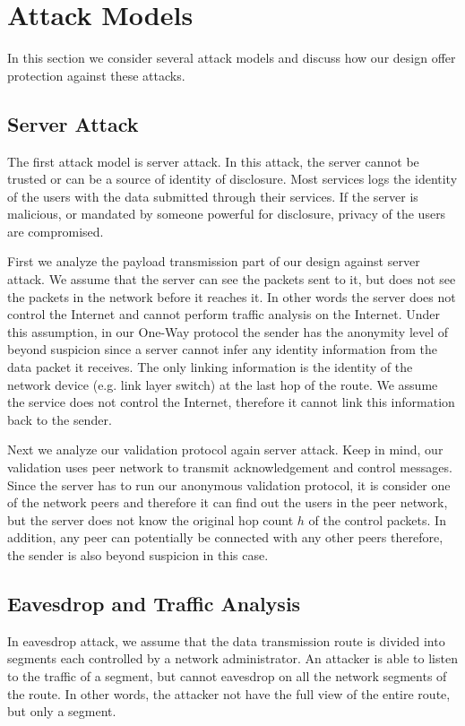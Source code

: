 \section{Attack Models}

In this section we consider several attack models and discuss how our
design offer protection against these attacks.

\subsection{Server Attack}
The first attack model is server attack. In this attack, the server cannot
be trusted or can be a source of identity of disclosure. Most services logs
the identity of the users with the data submitted through their services.
If the server is malicious, or mandated by someone powerful for disclosure,
privacy of the users are compromised.

First we analyze the payload transmission part of our design against
server attack. We assume that the server can see the packets sent to it,
but does not see the packets in the network before it reaches it. In
other words the server does not control the Internet and cannot perform
traffic analysis on the Internet. Under this assumption, in our One-Way
protocol the sender has the anonymity level of beyond suspicion since
a server cannot infer any identity information from the data packet it
receives. The only linking information is the identity of the network
device (e.g. link layer switch) at the last hop of the route. We assume
the service does not control the Internet, therefore it cannot link
this information back to the sender.

Next we analyze our validation protocol again server attack. Keep in mind,
our validation uses peer network to transmit acknowledgement and control
messages.
Since the server has to run our anonymous validation protocol, it is
consider one of the network peers and therefore it can
find out the users in the peer network, but the server does not know the
original hop count $h$ of the control packets. In addition, any peer can
potentially be connected with any other peers therefore, the sender is
also beyond suspicion in this case.

\subsection{Eavesdrop and Traffic Analysis}

In eavesdrop attack, we assume that the data transmission route is divided
into segments each controlled by a network administrator. An attacker is
able to listen to the traffic of a segment, but cannot eavesdrop
on all the network segments of the route. In other words, the attacker
not have the full view of the entire route, but only a segment.

